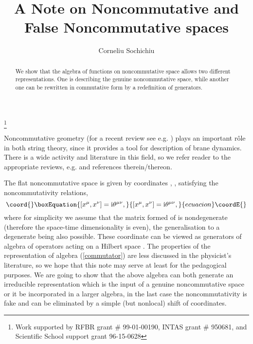 \documentclass[a4paper]{amsart}
\providecommand{\ii}{\mathrm{i}}
\providecommand{\hh}{\mathcal{H}}
\begin{document}
\title[Noncommutative \& False Noncommutative]{A Note on Noncommutative and
 False Noncommutative spaces}%
\author{Corneliu Sochichiu}%
\address{Institutul de Fizic\u a Aplicat\u a
A\c S, str. Academiei, nr. 5, Chi\c sin\u au, MD2028
MOLDOVA}%
\address{Bogoliubov Laboratory of Theoretical Physics\\
Joint Institute for Nuclear Research\\ 141980 Dubna, Moscow Reg.\\
RUSSIA}
%

\thanks{Work supported by RFBR grant \#  99-01-00190, INTAS grant \# 950681,
and Scientific School support grant 96-15-0628}%

\begin{abstract}
We show that the algebra of functions on noncommutative space
allows two different representations. One is describing the
genuine noncommutative space, while another one can be rewritten
in commutative form by a redefinition of generators.
\end{abstract}
\maketitle

Noncommutative geometry (for a recent review see e.g.
\cite{Connes:2000by}) plays an important r\^{o}le in both string
theory, since it provides a tool for description of brane
dynamics. There is a wide activity and literature in this field,
so we refer reader to the appropriate reviews, e.g.
\cite{Seiberg:1999vs} and references therein/thereon.

The flat noncommutative space is given by coordinates \coordHE{},
\coordHE{}, satisfying the noncommutativity relations,
\begin{equation}\coord{}\boxEquation{\label{commutator}
  [x^\mu,x^\nu]=\ii \theta^{\mu\nu},
}{[x^\mu,x^\nu]=\ii \theta^{\mu\nu},
}{ecuacion}\coordE{}\end{equation}
where for simplicity we assume that the matrix formed of
\myHighlight{$\theta^{\mu\nu}$}\coordHE{} is nondegenerate (therefore the space-time
dimensionality is even), the generalisation to a degenerate
\myHighlight{$\theta^{\mu\nu}$}\coordHE{} being also possible. These coordinate can be
viewed as generators of algebra of operators acting on a Hilbert
space \myHighlight{$\hh$}\coordHE{}. The properties of the representation of algebra
(\ref{commutator}) are less discussed in the physicist's
literature, so we hope that this note may serve at least for the
pedagogical purposes. We are going to show that the above algebra
can both generate an irreducible representation which is the input
of a genuine noncommutative space or it be incorporated in a
larger algebra, in the last case the noncommutativity is fake and
can be eliminated by a simple (but nonlocal) shift of coordinates.
\end{document}
